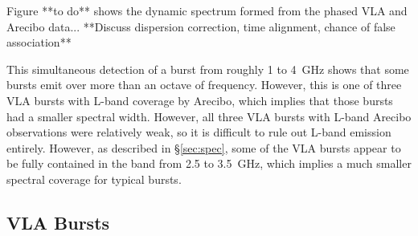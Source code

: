 \documentclass[twocolumn]{aastex61}
\begin{document}
Figure {\color{red} **to do**} shows the dynamic spectrum formed from the phased VLA and Arecibo data... **Discuss dispersion correction, time alignment, chance of false association** 

This simultaneous detection of a burst from roughly 1 to 4~GHz shows that some bursts emit over more than an octave of frequency. However, this is one of three VLA bursts with L-band coverage by Arecibo, which implies that those bursts had a smaller spectral width. However, all three VLA bursts with L-band Arecibo observations were relatively weak, so it is difficult to rule out L-band emission entirely. However, as described in \S \ref{sec:spec}, some of the VLA bursts appear to be fully contained in the band from 2.5 to 3.5~GHz, which implies a much smaller spectral coverage for typical bursts.


\subsection{VLA Bursts}
\end{document}
